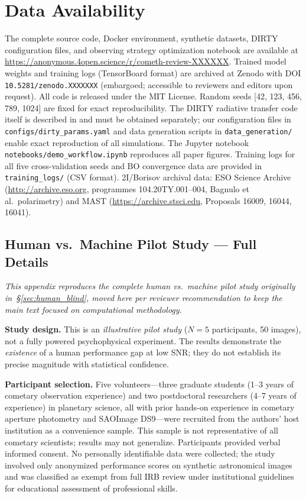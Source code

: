 \documentclass[usenatbib]{mnras}
\begin{document}
\section*{Data Availability}
The complete source code, Docker environment, synthetic datasets, DIRTY configuration files, and observing strategy optimization notebook are available at \url{https://anonymous.4open.science/r/cometh-review-XXXXXX}. Trained model weights and training logs (TensorBoard format) are archived at Zenodo with DOI \texttt{10.5281/zenodo.XXXXXXX} (embargoed; accessible to reviewers and editors upon request). All code is released under the MIT License. Random seeds [42, 123, 456, 789, 1024] are fixed for exact reproducibility. The DIRTY radiative transfer code itself is described in \citet{gordon01} and must be obtained separately; our configuration files in {\tt configs/dirty\_params.yaml} and data generation scripts in {\tt data\_generation/} enable exact reproduction of all simulations. The Jupyter notebook {\tt notebooks/demo\_workflow.ipynb} reproduces all paper figures. Training logs for all five cross-validation seeds and BO convergence data are provided in {\tt training\_logs/} (CSV format). 2I/Borisov archival data: ESO Science Archive (\url{http://archive.eso.org}, programmes 104.20TY.001--004, Bagnulo et al.\ polarimetry) and MAST (\url{https://archive.stsci.edu}, Proposals 16009, 16044, 16041).




\subsection{Human vs.\ Machine Pilot Study --- Full Details}\label{app:human_blind}

\textit{This appendix reproduces the complete human vs.\ machine pilot study originally in~\S\ref{sec:human_blind}, moved here per reviewer recommendation to keep the main text focused on computational methodology.}

\textbf{Study design.} This is an \textit{illustrative pilot study} ($N=5$ participants, 50 images), not a fully powered psychophysical experiment. The results demonstrate the \textit{existence} of a human performance gap at low SNR; they do not establish its precise magnitude with statistical confidence.

\textbf{Participant selection.} Five volunteers---three graduate students (1--3 years of cometary observation experience) and two postdoctoral researchers (4--7 years of experience) in planetary science, all with prior hands-on experience in cometary aperture photometry and SAOImage DS9---were recruited from the authors' host institution as a convenience sample. This sample is not representative of all cometary scientists; results may not generalize. Participants provided verbal informed consent. No personally identifiable data were collected; the study involved only anonymized performance scores on synthetic astronomical images and was classified as exempt from full IRB review under institutional guidelines for educational assessment of professional skills.
\end{document}
